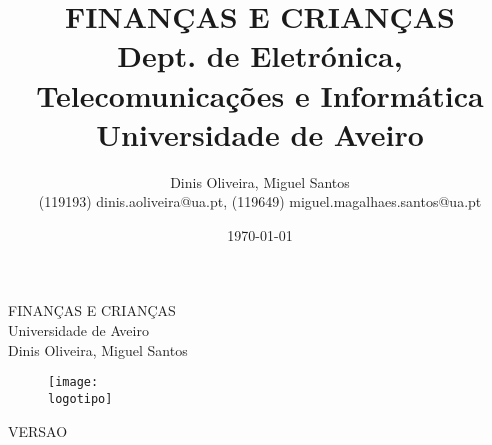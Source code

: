\documentclass{report}
\begin{document}
%
\def\titulo{FINANÇAS E CRIANÇAS}
\def\data{DATA}
\def\autores{Dinis Oliveira, Miguel Santos}
\def\autorescontactos{(119193) dinis.aoliveira@ua.pt, (119649) miguel.magalhaes.santos@ua.pt}
\def\versao{VERSAO}	
\def\departamento{Dept. de Eletrónica, Telecomunicações e Informática}
\def\empresa{Universidade de Aveiro}
\def\logotipo{ua.pdf}
%
%
\begin{titlepage}

\begin{center}
%
\vspace*{50mm}
%
{\Huge \titulo}\\ 
%
\vspace{10mm}
%
{\Large \empresa}\\
%
\vspace{10mm}
%
{\LARGE \autores}\\ 
%
\vspace{30mm}
%
\begin{figure}[h]
\center
\texttt{[image: \\logotipo]}
\end{figure}
%
\vspace{30mm}
\end{center}
%
\begin{flushright}
\versao
\end{flushright}
\end{titlepage}

\title{%
{\Huge\textbf{\titulo}}\\
{\Large \departamento\\ \empresa}
}
%
\author{%
    \autores \\
    \autorescontactos
}
%
\date{\today}
%
\maketitle

\end{document}
